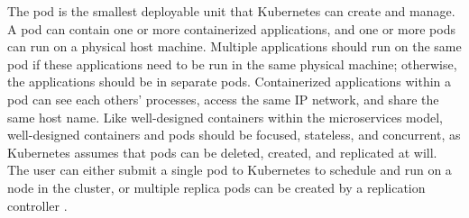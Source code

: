 The pod is the smallest deployable unit that Kubernetes can create and
manage. A pod can contain one or more
containerized applications, and one or more pods can run on a physical host
machine. Multiple applications should run on the same pod
if these applications need to be run in the same
physical machine; otherwise, the applications should be in separate pods.
Containerized applications within a pod can see each others' processes,
access the same IP network, and share the same host name. Like well-designed
containers within the microservices model, well-designed containers and pods should be
focused, stateless, and concurrent, as Kubernetes assumes that pods can be deleted,
created, and replicated at will. The user can either submit a
single pod to Kubernetes to schedule and run on a node in the cluster, or
multiple replica pods
can be created by a replication controller \cite{k8s-pods}.
